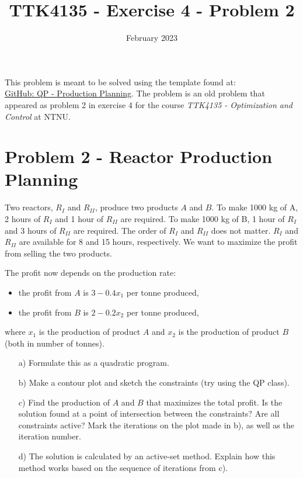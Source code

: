 \documentclass{article}
\title{TTK4135 - Exercise 4 - Problem 2}
\date{February 2023}
\begin{document}
\maketitle

This problem is meant to be solved using the template found at:\\
\href{https://github.com/TrymArve/QP/tree/main/Exercises/Production\%20Planning}{GitHub: QP - Production Planning}. The problem is an old problem that appeared as problem 2 in exercise 4 for the course \textit{TTK4135 - Optimization and Control} at NTNU.

\section*{Problem 2 - Reactor Production Planning}
Two reactors, $R_I$ and $R_{II}$, produce two products $A$ and $B$. To make 1000 kg of A, 2 hours of $R_I$ and 1 hour of $R_{II}$ are required. To make 1000 kg of B, 1 hour of $R_I$ and 3 hours of $R_{II}$ are required. The order of $R_I$ and $R_{II}$ does not matter. $R_I$ and $ R_{II}$ are available for 8 and 15 hours, respectively. We want to maximize the profit from selling the two products.

The profit now depends on the production rate:
\begin{itemize}
	\item the profit from $A$ is $3-0.4x_{1}$ per tonne produced,
	\item the profit from $B$ is $2-0.2x_{2}$ per tonne produced,
\end{itemize}
where $x_1$ is the production of product $A$ and $x_2$ is the production of product $B$ (both in number of tonnes).

\begin{itemize}
    \item[a)] Formulate this as a quadratic program.
    \item[b)] Make a contour plot and sketch the constraints (try using the QP class).
    \item[c)] Find the production of $A$ and $B$ that maximizes the total profit. Is the solution found at a point of intersection between the constraints? Are all constraints active? Mark the iterations on the plot made in b), as well as the iteration number.
    \item[d)] The solution is calculated by an active-set method. Explain how this method works based on the sequence of iterations from c).
\end{itemize}
\end{document}
